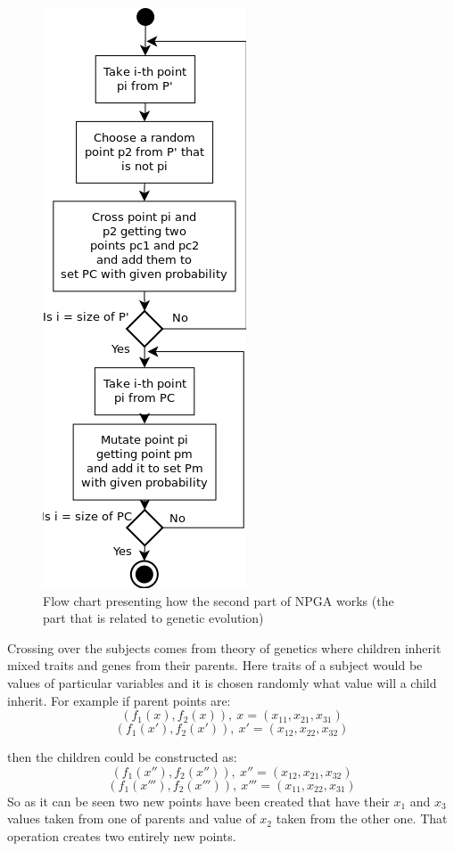 \documentclass[a4paper, 11pt]{article}
\begin{document}
	\begin{figure}[H]
	\centering
	\includegraphics[scale=0.8]{GA_algorithm}
	\caption{Flow chart presenting how the second part of NPGA works (the part that 
		is related to genetic evolution)}
	\label{fig:GA_algorithm}
	\end{figure}
	
	Crossing over the subjects comes from theory of genetics where children inherit
	mixed traits and genes from their parents. Here traits of a subject would be
	values of particular variables and it is chosen randomly what value will a 
	child inherit. For example if parent points are:
	$$(f_{1}(x), f_{2}(x)),\ x=(x_{11}, x_{21}, x_{31})$$
	$$(f_{1}(x'), f_{2}(x')),\ x'=(x_{12}, x_{22}, x_{32})$$
	
	then the children could be constructed as:
	$$(f_{1}(x''), f_{2}(x'')),\ x''=(x_{12}, x_{21}, x_{32})$$
	$$(f_{1}(x'''), f_{2}(x''')),\ x'''=(x_{11}, x_{22}, x_{31})$$
	So as it can be seen two new points have been created that have their $x_{1}$
	and $x_{3}$ values taken from one of parents and value of $x_{2}$ taken from the
	other one. That operation creates two entirely new points.
	
\end{document}
